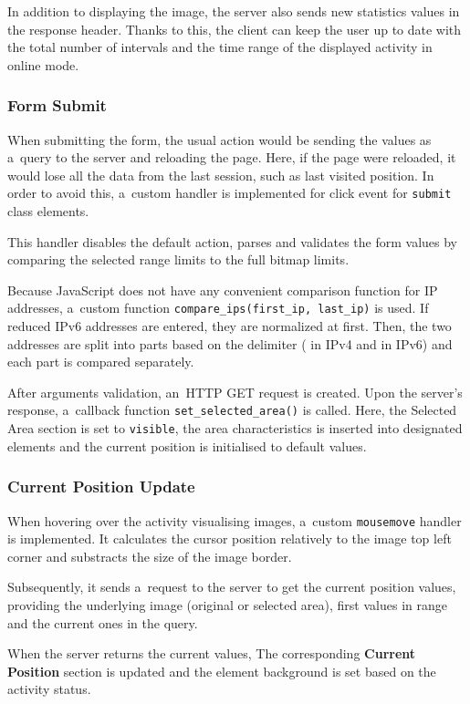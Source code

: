 In addition to displaying the image, the server also sends new statistics
values in the response header. Thanks to this, the client can keep
the user up to date with the total number of intervals and the
time range of the displayed activity in online mode.

\subsubsection{Form Submit}
When submitting the form, the usual action would be sending the values
as a~query to the server and reloading the page. Here, if the page
were reloaded, it would lose all the data from the last session, such as
last visited position. In order to avoid this, a~custom handler is
implemented for click event for \texttt{submit} class elements.

This handler disables the default action, parses and validates
the form values by comparing the selected range limits to the
full bitmap limits.

Because JavaScript does not have any convenient
comparison function for IP addresses, a~custom function
\texttt{compare\_ips(first\_ip, last\_ip)} is used. If reduced IPv6 addresses
are entered, they are normalized at first. Then, the two addresses are
split into parts based on the delimiter ( in IPv4 and \quotes{:} in IPv6) and
each part is compared separately.

After arguments validation, an~HTTP GET request is created. Upon the
server's response, a~callback function \texttt{set\_selected\_area()} is called.
Here, the Selected Area section is set to \texttt{visible},
the area characteristics is inserted into designated elements and the
current position is initialised to default values.

\subsubsection{Current Position Update}
When hovering over the activity visualising images, a~custom \texttt{mousemove}
handler is implemented. It calculates the cursor position relatively to the
image top left corner and substracts the size of the image border.

Subsequently, it sends a~request to the server to get the current position
values, providing the underlying image (original or selected area),
first values in range and the current ones in the query.

When the server returns the current values, The corresponding
\textbf{Current Position} section is updated and the element
background is set based on the activity status.

